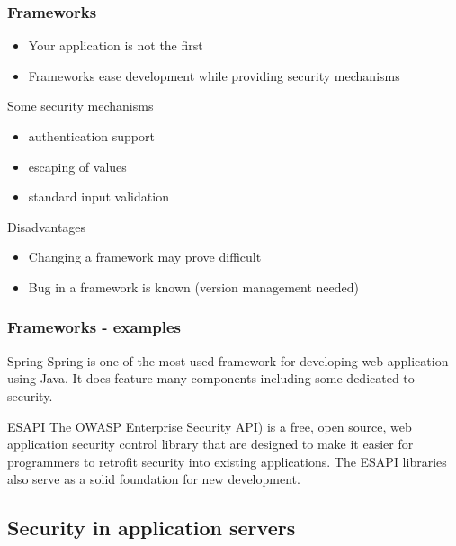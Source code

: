 \begin{frame}
\frametitle{Frameworks}
\begin{itemize}
\item Your application is not the first
\item Frameworks ease development while providing security mechanisms
\end{itemize}
\begin{block}{Some security mechanisms}
\begin{itemize}
\item authentication support
\item escaping of values
\item standard input validation
\end{itemize}
\end{block}
\begin{block}{Disadvantages}
\begin{itemize}
\item Changing a framework may prove difficult
\item Bug in a framework is known
	(version management needed)
\end{itemize}
\end{block}
\end{frame}

\begin{frame}
\frametitle{Frameworks - examples}

\begin{exampleblock}{Spring}
Spring is one of the most used framework for developing web application using
Java. It does feature many components including some dedicated to security.
\end{exampleblock}

\begin{exampleblock}{ESAPI}
The OWASP Enterprise Security API) is a free, open source, web application
security control library that are designed to make it easier for programmers
to retrofit security into existing applications.
The ESAPI libraries also serve as a solid foundation for new development.
\end{exampleblock}

\end{frame}

\subsection{Security in application servers}

